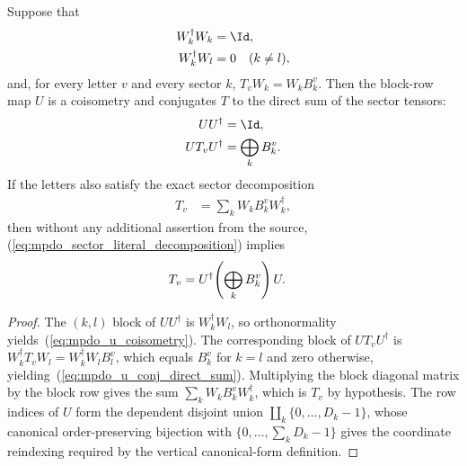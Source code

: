 \begin{lemma}
    \label{thm:vertical_sector_coisometry}
    \leanok
    Suppose that
    \begin{align}
        W_k^\dagger W_k & =\Id,
        \notag                             \\
        W_k^\dagger W_l & =0\quad(k\ne l),
        \notag
    \end{align}
    and, for every letter $v$ and every sector $k$,
    $T_vW_k=W_kB_k^v$. Then the block-row map $U$ is a coisometry and
    conjugates $T$ to the direct sum of the sector tensors:
    \begin{align}
        UU^\dagger    & =\Id,
        \label{eq:mpdo_u_coisometry}       \\
        UT_vU^\dagger & =\bigoplus_kB_k^v.
        \label{eq:mpdo_u_conj_direct_sum}
    \end{align}
    If the letters also satisfy the exact sector decomposition
    \begin{align}
        T_v & =\sum_kW_kB_k^vW_k^\dagger,
        \label{eq:mpdo_sector_literal_decomposition}
    \end{align}
    then without any additional assertion from the source,
    (\ref{eq:mpdo_sector_literal_decomposition}) implies
    \begin{align}
        T_v & =U^\dagger\!\left(\bigoplus_kB_k^v\right)U.
        \notag
    \end{align}
\end{lemma}

\begin{proof}
    \leanok
    The $(k,l)$ block of $UU^\dagger$ is $W_k^\dagger W_l$, so orthonormality
    yields~(\ref{eq:mpdo_u_coisometry}). The corresponding block of
    $UT_vU^\dagger$ is
    $W_k^\dagger T_vW_l=W_k^\dagger W_lB_l^v$, which equals $B_k^v$ for $k=l$
    and zero otherwise, yielding~(\ref{eq:mpdo_u_conj_direct_sum}). Multiplying
    the block diagonal matrix
    by the block row gives the sum $\sum_kW_kB_k^vW_k^\dagger$, which is
    $T_v$ by hypothesis. The row indices of $U$ form the dependent disjoint
    union $\coprod_k\{0,\ldots,D_k-1\}$, whose canonical order-preserving
    bijection with $\{0,\ldots,\sum_kD_k-1\}$ gives the coordinate reindexing
    required by the vertical canonical-form definition.
\end{proof}

